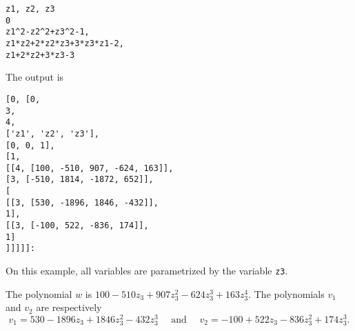 \documentclass[a4paper,english,11pt]{scrartcl}
\theoremstyle{definition}
\theoremstyle{remark}
\begin{document}
\begin{tcolorbox}
\begin{verbatim}
z1, z2, z3
0
z1^2-z2^2+z3^2-1,
z1*z2+2*z2*z3+3*z3*z1-2,
z1+2*z2+3*z3-3
\end{verbatim}
\end{tcolorbox}
The output is 
\begin{tcolorbox}
\begin{verbatim}
[0, [0, 
3, 
4, 
['z1', 'z2', 'z3'],
[0, 0, 1],
[1,
[[4, [100, -510, 907, -624, 163]],
[3, [-510, 1814, -1872, 652]],
[
[[3, [530, -1896, 1846, -432]],
1],
[[3, [-100, 522, -836, 174]],
1]
]]]]]:
\end{verbatim}
\end{tcolorbox}
On this example, all variables are parametrized by the variable \verb+z3+. 

The polynomial $w$ is $100-510z_3 + 907z_3^2 -624z_3^3+ 163z_3^4$. 
The polynomials $v_1$ and $v_2$ are respectively 
\[
    v_1 = 530-1896 z_3 + 1846 z_3^2 -432 z_3^3 \quad \text{ and } 
    \quad v_2 = -100+ 522 z_3 -836 z_3^2+ 174 z_3^3.
\]





\end{document}
